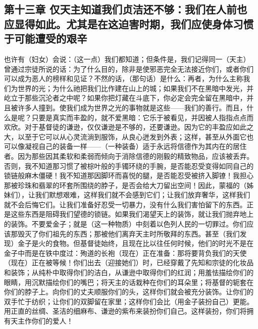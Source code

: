 
\subsection{第十三章 仅天主知道我们贞洁还不够：我们在人前也应显得如此。尤其是在这迫害时期，我们应使身体习惯于可能遭受的艰辛}

也许有（妇女）会说：（这一点）我们都知道；但条件是，我们记得同一（天主）曾通过宗徒所说的话：为了什么目的，除非是使邪恶完全无法接近你们，或者你们可以成为恶人的榜样和见证？不然的话，（那句话）是什么：再者，为什么主称我们为世界的光；为什么祂把我们比作建在山上的城；如果我们不在黑暗中发光，并屹立于那些沉沦者之中呢？如果你把灯藏在斗底下，你必定会完全留在黑暗中，并且被许多人撞到。使我们成为世界之光的事物就是这些——我们的善行。而且，什么是呢？只要是真实而丰盈的，就不爱黑暗：它乐于被看见，并因被人指指点点而欢欣。对于基督徒的谦逊，仅仅谦逊是不够的，还要谦逊。因为它的丰盈应如此之大，以至于它可以从心灵流淌到服饰，从良心迸发到外表；这样，甚至从外面它也可以像凝视自己的装备一样——（一种装备）适于永远将信德作为其内在的居住者。因为那些因其柔软和柔弱而倾向于消除信德的刚毅的精致物品，应该被丢弃。否则，我不知道那习惯了被棕叶般的手镯环绕的手腕，是否能忍受变得如同自己的锁链般麻木僵硬！我不知道那因脚环而喜悦的腿，是否能忍受被挤入脚镣！我担心那被珍珠和翡翠的环套所围绕的脖子，是否会给大刀留出空间！因此，蒙福的（姊妹们），让我们默想艰难，这样我们就不会感到它们；让我们放弃奢华，这样我们就不会后悔它们。让我们准备好忍受一切暴力，没有什么我们害怕留下的东西。正是这些东西是阻碍我们望德的锁链。如果我们渴望天上的装饰，就让我们抛弃地上的装饰。不要爱金子；就是（这一种物质）中刻着以色列人民的一切罪过。你们应该那毁灭了你们祖先的东西；那被他们离弃天主时所敬拜的东西。甚至（我们发现）金子是火的食物。但基督徒始终，且现在比以往任何时候，他们的时光不是在金子中而是在铁中度过：殉道的长袍（现在）正在准备：那将要背负我们的天使（现在）正在被等候！你们出去（迎接她们）时，已经穿戴了先知和宗徒的化妆品和装饰；从纯朴中取得你们的洁白，从谦逊中取得你们的红润；用羞怯描绘你们的眼睛，用沉默描绘你们的嘴巴；将天主的话栽种在你们的耳朵里；将基督的轭套在你们的脖子上。向你们的丈夫顺服你们的头，这样你们就会被充分装饰。让你们的双手忙于纺织；让你们的双脚留在家里；这样你们会比（用金子装扮自己）更能。用正直的丝绸、圣洁的细麻布、谦逊的紫布来装扮你们自己。这样装扮，你们将拥有天主作你们的爱人！\par

